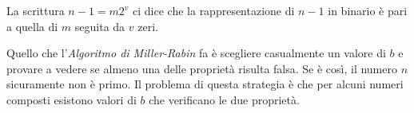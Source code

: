 \begin{note}
    La scrittura $n-1=m2^v$ ci dice che la rappresentazione di $n-1$ in
    binario è pari a quella di $m$ seguita da $v$ zeri.
\end{note}

\noindent
Quello che l'\emph{Algoritmo di Miller-Rabin} fa è scegliere casualmente un
valore di $b$ e provare a vedere se almeno una delle proprietà risulta
falsa. Se è così, il numero $n$ sicuramente non è primo. Il problema di
questa strategia è che per alcuni numeri composti esistono valori di $b$
che verificano le due proprietà.